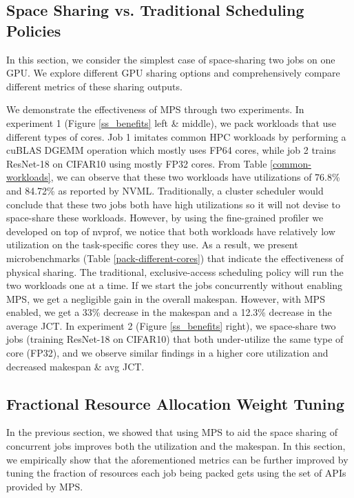 \documentclass{article}
\begin{document}
\subsection{Space Sharing vs. Traditional Scheduling Policies}

In this section, we consider the simplest case of space-sharing two jobs on one GPU. We explore different GPU sharing options and comprehensively compare different metrics of these sharing outputs.

We demonstrate the effectiveness of MPS through two experiments. In experiment 1 (Figure \ref{ss_benefits} left \& middle), we pack workloads that use different types of cores. Job 1 imitates common HPC workloads by performing a cuBLAS DGEMM operation which mostly uses FP64 cores, while job 2 trains ResNet-18 on CIFAR10 using mostly FP32 cores. From Table \ref{common-workloads}, we can observe that these two workloads have utilizations of 76.8\% and 84.72\% as reported by NVML. Traditionally, a cluster scheduler would conclude that these two jobs both have high utilizations so it will not devise to space-share these workloads. However, by using the fine-grained profiler we developed on top of nvprof, we notice that both workloads have relatively low utilization on the task-specific cores they use. As a result, we present microbenchmarks (Table \ref{pack-different-cores}) that indicate the effectiveness of physical sharing. The traditional, exclusive-access scheduling policy will run the two workloads one at a time. If we start the jobs concurrently without enabling MPS, we get a negligible gain in the overall makespan. However, with MPS enabled, we get a 33\% decrease in the makespan and a 12.3\% decrease in the average JCT. In experiment 2 (Figure \ref{ss_benefits} right), we space-share two jobs (training ResNet-18 on CIFAR10) that both under-utilize the same type of core (FP32), and we observe similar findings in a higher core utilization and decreased makespan \& avg JCT.




\subsection{Fractional Resource Allocation Weight Tuning}

In the previous section, we showed that using MPS to aid the space sharing of concurrent jobs improves both the utilization and the makespan. In this section, we empirically show that the aforementioned metrics can be further improved by tuning the fraction of resources each job being packed gets using the set of APIs provided by MPS.
\end{document}
